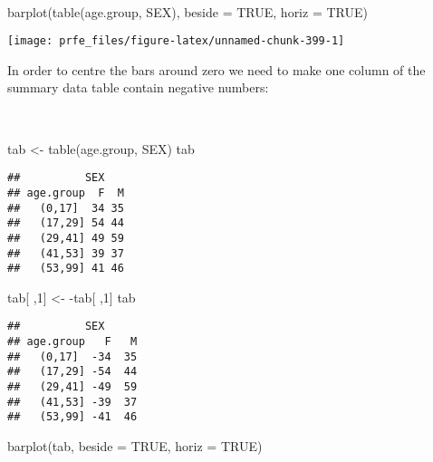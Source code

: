\documentclass[
  12pt,
  a4paper]{book}
\newenvironment{Shaded}{\begin{snugshade}}{\end{snugshade}}
\newcommand{\AttributeTok}[1]{\textcolor[rgb]{0.77,0.63,0.00}{#1}}
\newcommand{\ConstantTok}[1]{\textcolor[rgb]{0.00,0.00,0.00}{#1}}
\newcommand{\DecValTok}[1]{\textcolor[rgb]{0.00,0.00,0.81}{#1}}
\newcommand{\FunctionTok}[1]{\textcolor[rgb]{0.00,0.00,0.00}{#1}}
\newcommand{\NormalTok}[1]{#1}
\newcommand{\OtherTok}[1]{\textcolor[rgb]{0.56,0.35,0.01}{#1}}
\newcommand{\SpecialCharTok}[1]{\textcolor[rgb]{0.00,0.00,0.00}{#1}}
\begin{document}
~

\begin{Shaded}
\begin{Highlighting}[]
\FunctionTok{barplot}\NormalTok{(}\FunctionTok{table}\NormalTok{(age.group, SEX), }\AttributeTok{beside =} \ConstantTok{TRUE}\NormalTok{, }\AttributeTok{horiz =} \ConstantTok{TRUE}\NormalTok{)}
\end{Highlighting}
\end{Shaded}

\begin{center}\texttt{[image: prfe\_files/figure-latex/unnamed-chunk-399-1]} \end{center}

\newpage

In order to centre the bars around zero we need to make one column of the summary data table contain negative numbers:

~

\begin{Shaded}
\begin{Highlighting}[]
\NormalTok{tab }\OtherTok{\textless{}{-}} \FunctionTok{table}\NormalTok{(age.group, SEX)}
\NormalTok{tab}
\end{Highlighting}
\end{Shaded}

\begin{verbatim}
##          SEX
## age.group  F  M
##   (0,17]  34 35
##   (17,29] 54 44
##   (29,41] 49 59
##   (41,53] 39 37
##   (53,99] 41 46
\end{verbatim}

\begin{Shaded}
\begin{Highlighting}[]
\NormalTok{tab[ ,}\DecValTok{1}\NormalTok{] }\OtherTok{\textless{}{-}} \SpecialCharTok{{-}}\NormalTok{tab[ ,}\DecValTok{1}\NormalTok{]}
\NormalTok{tab}
\end{Highlighting}
\end{Shaded}

\begin{verbatim}
##          SEX
## age.group   F   M
##   (0,17]  -34  35
##   (17,29] -54  44
##   (29,41] -49  59
##   (41,53] -39  37
##   (53,99] -41  46
\end{verbatim}

\begin{Shaded}
\begin{Highlighting}[]
\FunctionTok{barplot}\NormalTok{(tab, }\AttributeTok{beside =} \ConstantTok{TRUE}\NormalTok{, }\AttributeTok{horiz =} \ConstantTok{TRUE}\NormalTok{)}
\end{Highlighting}
\end{Shaded}
\end{document}
